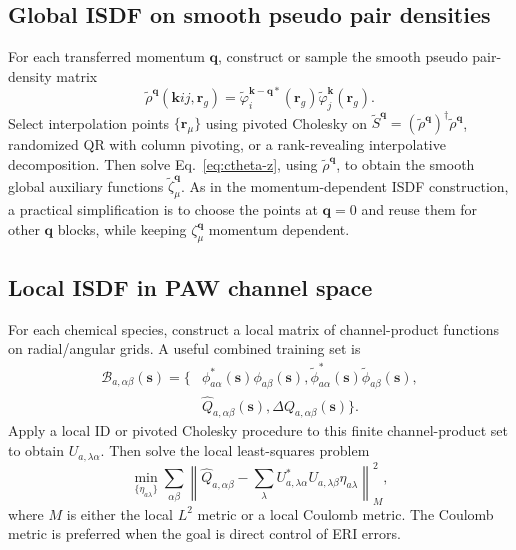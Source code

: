 \documentclass[aps,prb,reprint,superscriptaddress,longbibliography,nofootinbib]{revtex4-2}
\newcommand{\br}{\mathbf r}
\newcommand{\bk}{\mathbf k}
\newcommand{\bq}{\mathbf q}
\begin{document}
\subsection{Global ISDF on smooth pseudo pair densities}

For each transferred momentum \(\bq\), construct or sample the smooth pseudo pair-density matrix
\begin{equation}
\widetilde\rho^{\bq}(\bk ij,\br_g)
=
\widetilde\varphi_i^{\bk-\bq *}(\br_g)
\widetilde\varphi_j^{\bk}(\br_g).
\label{eq:smooth-pair-matrix}
\end{equation}
Select interpolation points \(\{\br_\mu\}\) using pivoted Cholesky on \(\widetilde S^{\bq}=(\widetilde\rho^{\bq})^\dagger\widetilde\rho^{\bq}\), randomized QR with column pivoting, or a rank-revealing interpolative decomposition.  Then solve Eq.~\eqref{eq:ctheta-z}, using \(\widetilde\rho^{\bq}\), to obtain the smooth global auxiliary functions \(\widetilde\zeta_\mu^{\bq}\).  As in the momentum-dependent ISDF construction, a practical simplification is to choose the points at \(\bq=0\) and reuse them for other \(\bq\) blocks, while keeping \(\zeta_\mu^{\bq}\) momentum dependent.

\subsection{Local ISDF in PAW channel space}

For each chemical species, construct a local matrix of channel-product functions on radial/angular grids.  A useful combined training set is
\begin{equation}
\begin{aligned}
\mathcal B_{a,\alpha\beta}(\mathbf s)
=\{&
\phi_{a\alpha}^*(\mathbf s)\phi_{a\beta}(\mathbf s),
\widetilde\phi_{a\alpha}^*(\mathbf s)\widetilde\phi_{a\beta}(\mathbf s),
\\
&\widehat Q_{a,\alpha\beta}(\mathbf s),
\Delta Q_{a,\alpha\beta}(\mathbf s)\}.
\end{aligned}
\label{eq:local-training-set}
\end{equation}
Apply a local ID or pivoted Cholesky procedure to this finite channel-product set to obtain \(U_{a,\lambda\alpha}\).  Then solve the local least-squares problem
\begin{equation}
\min_{\{\eta_{a\lambda}\}}
\sum_{\alpha\beta}
\left\|
\widehat Q_{a,\alpha\beta}
-
\sum_\lambda U_{a,\lambda\alpha}^*U_{a,\lambda\beta}\eta_{a\lambda}
\right\|_M^2,
\label{eq:eta-fit}
\end{equation}
where \(M\) is either the local \(L^2\) metric or a local Coulomb metric.  The Coulomb metric is preferred when the goal is direct control of ERI errors.
\end{document}
